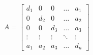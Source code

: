 \documentclass[10pt]{book}
\begin{document}
\begin{mdSnippets}
\begin{mdDisplaySnippet}[9de8bf14b94c493e99878c09f3b96e57]%
\begin{mdDiv}[class={mathdisplay,math-display},color={},math-needpdf={}]%
\[%
A = 
\begin{bmatrix}
    d_{1}  & 0      & 0      & \dots  & a_{1}  \\
    0      & d_{2}  & 0      & \dots  & a_{2}  \\
    0      & 0      & d_{3}  & \dots  & a_{3}  \\
    \vdots & \vdots & \vdots & \ddots & \vdots \\
    a_{1}  & a_{2}  & a_{3}  & \dots  & d_{n}
\end{bmatrix}
\]%
\end{mdDiv}%


\end{mdDisplaySnippet}
\end{mdSnippets}
\end{document}
